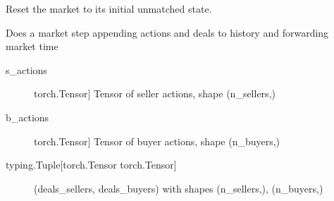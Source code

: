 \documentclass[letterpaper,10pt,english]{sphinxmanual}
\begin{document}
\begin{fulllineitems}

\begin{fulllineitems}
\label{\detokenize{MultiAgentMarketRL:markets.BaseMarketEngine.reset}}
\sphinxAtStartPar
Reset the market to its initial unmatched state.

\end{fulllineitems}


\begin{fulllineitems}
\label{\detokenize{MultiAgentMarketRL:markets.BaseMarketEngine.step}}
\sphinxAtStartPar
Does a market step appending actions and deals to history and forwarding market time
\begin{description}
\item[{s\_actions}] \leavevmode{[}torch.Tensor{]}
\sphinxAtStartPar
Tensor of seller actions, shape (n\_sellers,)

\item[{b\_actions}] \leavevmode{[}torch.Tensor{]}
\sphinxAtStartPar
Tensor of buyer actions, shape (n\_buyers,)

\end{description}
\begin{description}
\item[{typing.Tuple{[}torch.Tensor torch.Tensor{]}}] \leavevmode
\sphinxAtStartPar
(deals\_sellers, deals\_buyers) with shapes (n\_sellers,), (n\_buyers,)

\end{description}

\end{fulllineitems}


\end{fulllineitems}

\end{document}
